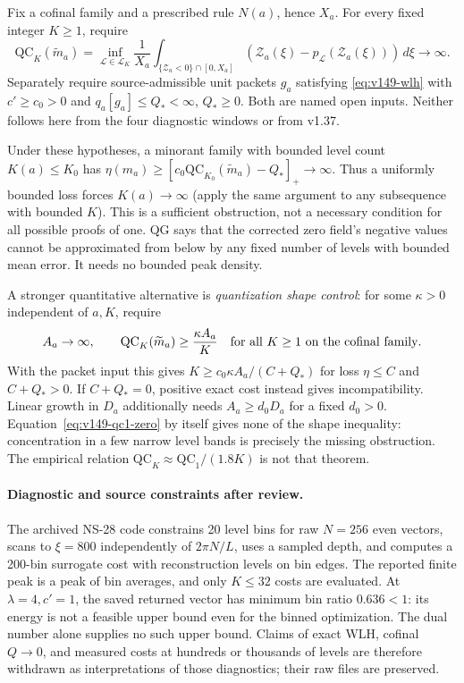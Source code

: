 \begin{assumption}
\label{ass:v149-qg}
Fix a cofinal family and a prescribed rule $N(a)$, hence $X_a$.
For every fixed integer $K\ge1$, require
\begin{equation}\label{eq:v149-qg}
 \mathrm{QC}_K(\widetilde m_a)
 =\inf_{\mathcal L\in\mathcal L_K}\frac1{X_a}
   \int_{\{\mathcal Z_a<0\}\cap[0,X_a]}
       (\mathcal Z_a(\xi)-p_{\mathcal L}(\mathcal Z_a(\xi)))\,d\xi
 \longrightarrow\infty.
\end{equation}
Separately require source-admissible unit packets $g_a$ satisfying
\eqref{eq:v149-wlh} with $c'\ge c_0>0$ and $q_a[g_a]\le Q_*<\infty$, $Q_*\ge0$.
Both are named open inputs. Neither follows here from the four diagnostic
windows or from v1.37.
\end{assumption}
Under these hypotheses, a minorant family with bounded level count
$K(a)\le K_0$ has
$\eta(m_a)\ge[c_0\mathrm{QC}_{K_0}(\widetilde m_a)-Q_*]_+\to\infty$.
Thus a uniformly bounded loss forces $K(a)\to\infty$ (apply the same
argument to any subsequence with bounded $K$). This is a sufficient
obstruction, not a necessary condition for all possible proofs of one.
QG says that the corrected zero field's negative values cannot be
approximated from below by any fixed number of levels with bounded
mean error. It needs no bounded peak density.

A stronger quantitative alternative is \emph{quantization shape control}:
for some $\kappa>0$ independent of $a,K$, require
\begin{equation}\label{eq:v149-shape}
 A_a\to\infty,\qquad
 \mathrm{QC}_K(\widetilde m_a)\ge\frac{\kappa A_a}{K}
 \quad\hbox{for all }K\ge1\hbox{ on the cofinal family}.
\end{equation}
With the packet input this gives
$K\ge c_0\kappa A_a/(C+Q_*)$ for loss $\eta\le C$ and $C+Q_*>0$.
If $C+Q_*=0$, positive exact cost instead gives incompatibility.
Linear growth in $D_a$ additionally needs $A_a\ge d_0D_a$ for a fixed
$d_0>0$. Equation~\eqref{eq:v149-qc1-zero} by itself gives none of the
shape inequality: concentration in a few narrow level bands is precisely
the missing obstruction. The empirical relation
$\mathrm{QC}_K\approx\mathrm{QC}_1/(1.8K)$ is not that theorem.

\paragraph{Diagnostic and source constraints after review.}
The archived NS-28 code constrains 20 level bins for raw $N=256$ even
vectors, scans to $\xi=800$ independently of $2\pi N/L$, uses a sampled
depth, and computes a 200-bin surrogate cost with reconstruction levels
on bin edges. The reported finite peak is a peak of bin averages, and
only $K\le32$ costs are evaluated. At $\lambda=4,c'=1$, the saved
returned vector has minimum bin ratio $0.636<1$: its energy is not a
feasible upper bound even for the binned optimization. The dual number
alone supplies no such upper bound. Claims of exact WLH, cofinal
$Q\to0$, and measured costs at hundreds or thousands of levels are
therefore withdrawn as interpretations of those diagnostics; their
raw files are preserved.

